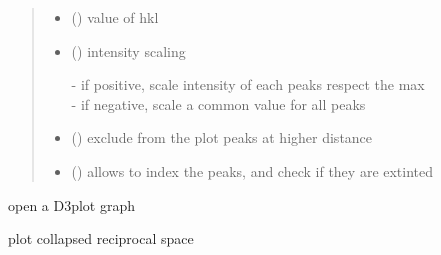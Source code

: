 \documentclass[letterpaper,10pt,english]{sphinxmanual}
\begin{document}
\begin{fulllineitems}
\begin{fulllineitems}
\begin{quote}
\begin{description}
\begin{itemize}
\item {} 
 (\sphinxstyleliteralemphasis{\sphinxupquote{, }}) \textendash{} value of hkl

\item {} 
 () \textendash{} intensity scaling \begin{description}
     \item[-{ if positive, scale intensity of each peaks respect the max}]
      \item[-{ if negative, scale a common value for all peaks}]


\end{description}


\item {} 
 () \textendash{} exclude from the plot peaks at higher distance

\item {} 
 () \textendash{} allows to index the peaks, and check if they are extinted

\end{itemize}

\end{description}\end{quote}

\end{fulllineitems}


\begin{fulllineitems}
\label{\detokenize{index:TEMpcPlot.EwaldPeaks.plot}}
open a D3plot graph

\end{fulllineitems}


\begin{fulllineitems}
\label{\detokenize{index:TEMpcPlot.EwaldPeaks.plot_reduce}}
plot collapsed reciprocal space


\end{fulllineitems}
\end{fulllineitems}
\end{document}
